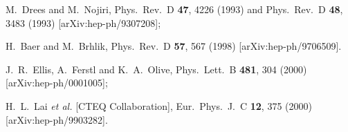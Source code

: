 \begin{thebibliography}{99}
M.~Drees and M.~Nojiri,
Phys.\ Rev.\ D {\bf 47}, 4226 (1993) and
Phys.\ Rev.\ D {\bf 48}, 3483 (1993)
[arXiv:hep-ph/9307208];

H.~Baer and M.~Brhlik,
Phys.\ Rev.\ D {\bf 57}, 567 (1998)
[arXiv:hep-ph/9706509].

J.~R.~Ellis, A.~Ferstl and K.~A.~Olive,
Phys.\ Lett.\ B {\bf 481}, 304 (2000)
[arXiv:hep-ph/0001005];

H.~L.~Lai {\it et al.}  [CTEQ Collaboration],
Eur.\ Phys.\ J.\ C {\bf 12}, 375 (2000)
[arXiv:hep-ph/9903282].

\end{thebibliography}
